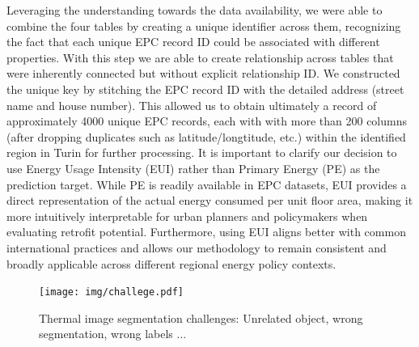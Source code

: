 \documentclass[preprint,12pt]{elsarticle}
\begin{document}
       \begin{table}[h!]
        \centering
        \caption{Transposed Summary Statistics for Selected Tables}
        \label{tab:transposed_table_stats}
        \end{table}
        
        Leveraging the understanding towards the data availability, we were able to combine the four tables by creating a unique identifier across them, recognizing the fact that each unique EPC record ID could be associated with different properties. With this step we are able to create relationship across tables that were inherently connected but without explicit relationship ID. We constructed the unique key by stitching the EPC record ID with the detailed address (street name and house number). This allowed us to obtain ultimately a record of approximately 4000 unique EPC records, each with with more than 200 columns (after dropping duplicates such as latitude/longtitude, etc.) within the identified region in Turin for further processing. It is important to clarify our decision to use Energy Usage Intensity (EUI) rather than Primary Energy (PE) as the prediction target. While PE is readily available in EPC datasets, EUI provides a direct representation of the actual energy consumed per unit floor area, making it more intuitively interpretable for urban planners and policymakers when evaluating retrofit potential. Furthermore, using EUI aligns better with common international practices and allows our methodology to remain consistent and broadly applicable across different regional energy policy contexts.

    
       \begin{figure}[h]
            \centering
            \texttt{[image: img/challege.pdf]}
            \caption{Thermal image segmentation challenges: Unrelated object, wrong segmentation, wrong labels ...}
            \label{fig:thermseg-challenge}
        \end{figure}
    
\end{document}
